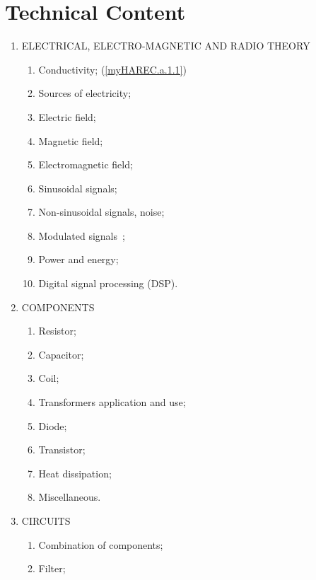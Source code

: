 \section{Technical Content}

\renewcommand{\labelenumi}{\theenumi.}
\renewcommand{\theenumii}{\arabic{enumii}}
\renewcommand{\labelenumii}{\theenumi.\theenumii}
\begin{enumerate}
\item ELECTRICAL, ELECTRO-MAGNETIC AND RADIO THEORY
\begin{enumerate}[noitemsep]
\item Conductivity; (\ref{myHAREC.a.1.1})\label{HAREC.a.1.1}
\item Sources of electricity; \label{HAREC.a.1.2}
\item Electric field; \label{HAREC.a.1.3}
\item Magnetic field; \label{HAREC.a.1.4}
\item Electromagnetic field; \label{HAREC.a.1.5}
\item Sinusoidal signals; \label{HAREC.a.1.6}
\item Non-sinusoidal signals, noise; \label{HAREC.a.1.7}
\item Modulated signals ; \label{HAREC.a.1.8}
\item Power and energy; \label{HAREC.a.1.9}
\item Digital signal processing (DSP). \label{HAREC.a.1.10}
\end{enumerate}
\item COMPONENTS
\begin{enumerate}[noitemsep]
\item Resistor; \label{HAREC.a.2.1}
\item Capacitor; \label{HAREC.a.2.2}
\item Coil; \label{HAREC.a.2.3}
\item Transformers application and use; \label{HAREC.a.2.4}
\item Diode; \label{HAREC.a.2.5}
\item Transistor; \label{HAREC.a.2.6}
\item Heat dissipation; \label{HAREC.a.2.7}
\item Miscellaneous. \label{HAREC.a.2.8}
\end{enumerate}
\item CIRCUITS
\begin{enumerate}[noitemsep]
\item Combination of components; \label{HAREC.a.3.1}
\item Filter; \label{HAREC.a.3.2}

\end{enumerate}
\end{enumerate}
